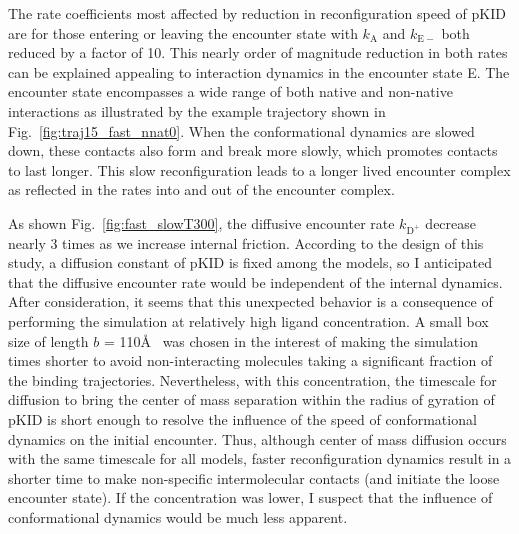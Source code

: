 \documentclass[../talant.diss.submit.tex]{subfiles}
\begin{document}
The rate coefficients most affected 
by reduction in reconfiguration speed
of pKID are for those entering or leaving the encounter state with
$k_\mathrm{A}$ and $k_\mathrm{E-}$ both reduced by a factor of 10.
This nearly order of magnitude reduction in both rates
can be explained appealing to interaction dynamics in the encounter state E.
The encounter state encompasses a wide range of both 
native and non-native interactions as illustrated by the example trajectory  shown in
Fig.~\ref{fig:traj15_fast_nnat0}.
When the conformational dynamics are slowed down, 
these contacts also form and break more slowly, which promotes contacts to last longer.
This slow reconfiguration leads to a longer lived encounter complex as reflected
in the rates into and out of the encounter complex.

As shown Fig.~\ref{fig:fast_slowT300}, the diffusive encounter rate $k_{\mathrm{D}^{+}}$
decrease nearly 3 times as we increase internal friction. 
According to the design of this study, a diffusion constant of pKID is fixed among
the models, so I anticipated that the diffusive encounter rate would be independent
of the internal dynamics.
After consideration, it seems that this unexpected behavior is a consequence of
performing the simulation at relatively high ligand concentration. A small box size of length
$b$ = 110\AA~ was chosen in the interest of making the simulation times shorter to avoid
non-interacting molecules taking a significant fraction of the binding trajectories.
Nevertheless, with this concentration, the timescale for diffusion to bring the
center of mass separation within the radius of gyration of pKID is short enough to  resolve the influence of
the speed of conformational dynamics on the initial encounter.
Thus, although  center of mass diffusion occurs with the same timescale for all models, faster
reconfiguration dynamics result in a shorter time to make non-specific intermolecular contacts
(and initiate the loose encounter state). If the concentration was lower, I suspect that the influence
of conformational dynamics would be much less apparent. 

\end{document}
